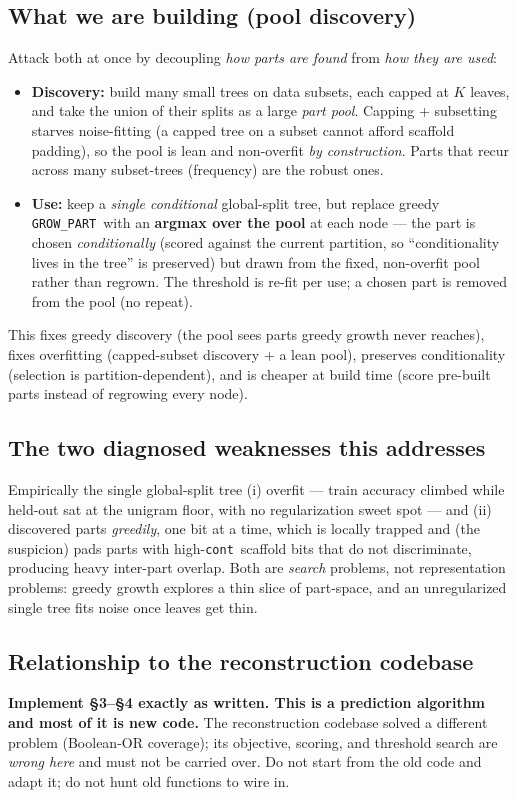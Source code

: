 \documentclass[11pt]{article}
\newcommand{\code}[1]{\texttt{#1}}
\newcommand{\cont}{\code{cont}}
\newcommand{\grow}{\code{GROW\_PART}}
\begin{document}
\subsection{What we are building (pool discovery)}
Attack both at once by decoupling \emph{how parts are found} from \emph{how they are used}:
\begin{itemize}[nosep]
\item \textbf{Discovery:} build many small trees on data subsets, each capped at $K$ leaves, and take the union of their splits as a large \emph{part pool}. Capping + subsetting starves noise-fitting (a capped tree on a subset cannot afford scaffold padding), so the pool is lean and non-overfit \emph{by construction}. Parts that recur across many subset-trees (frequency) are the robust ones.
\item \textbf{Use:} keep a \emph{single conditional} global-split tree, but replace greedy \grow\ with an \textbf{argmax over the pool} at each node --- the part is chosen \emph{conditionally} (scored against the current partition, so ``conditionality lives in the tree'' is preserved) but drawn from the fixed, non-overfit pool rather than regrown. The threshold is re-fit per use; a chosen part is removed from the pool (no repeat).
\end{itemize}
This fixes greedy discovery (the pool sees parts greedy growth never reaches), fixes overfitting (capped-subset discovery + a lean pool), preserves conditionality (selection is partition-dependent), and is cheaper at build time (score pre-built parts instead of regrowing every node).


\subsection{The two diagnosed weaknesses this addresses}
Empirically the single global-split tree (i) overfit --- train accuracy climbed while held-out sat at the unigram floor, with no regularization sweet spot --- and (ii) discovered parts \emph{greedily}, one bit at a time, which is locally trapped and (the suspicion) pads parts with high-\cont\ scaffold bits that do not discriminate, producing heavy inter-part overlap. Both are \emph{search} problems, not representation problems: greedy growth explores a thin slice of part-space, and an unregularized single tree fits noise once leaves get thin.


\subsection{Relationship to the reconstruction codebase}
\textbf{Implement \S3--\S4 exactly as written. This is a prediction algorithm and most of it is new code.} The reconstruction codebase solved a different problem (Boolean-OR coverage); its objective, scoring, and threshold search are \emph{wrong here} and must not be carried over. Do not start from the old code and adapt it; do not hunt old functions to wire in.
\end{document}
